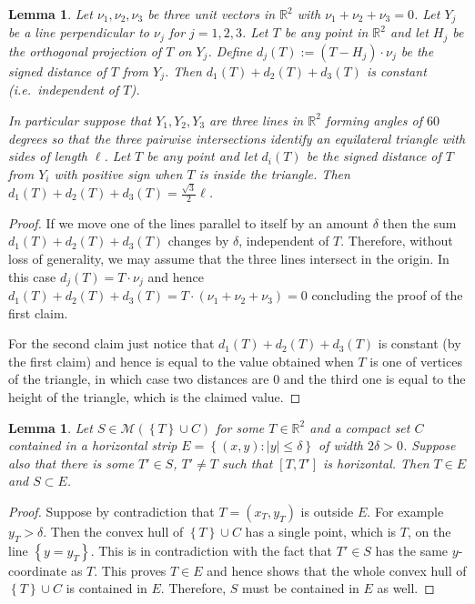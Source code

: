 \documentclass{amsart}
\newcommand{\RR}{\mathbb R}
\newcommand{\abs}[1]{\left\vert #1 \right\vert}
\newcommand{\ENCLOSE}[1]{\left\{#1\right\}}
\newcommand{\M}{\mathcal{M}}
\newtheorem{lemma}[theorem]{Lemma}
\theoremstyle{definition}
\theoremstyle{remark}
\begin{document}
  \begin{lemma}\label{lm:tripod}
    Let $\nu_1,\nu_2,\nu_3$ be three unit vectors in $\RR^2$
    with $\nu_1+\nu_2+\nu_3=0$. 
    Let $Y_j$ be a line perpendicular to $\nu_j$ for $j=1,2,3$.
    Let $T$ be any point in $\RR^2$ and let $H_j$ be the orthogonal 
    projection of $T$ on $Y_j$.
    Define $d_j(T) := (T-H_j)\cdot \nu_j$
    be the signed distance of $T$ from $Y_j$.
    Then $d_1(T) + d_2(T) + d_3(T)$ is constant 
    (i.e.\ independent of $T$).
  
    In particular suppose that  
    $Y_1,Y_2,Y_3$ are three lines in $\RR^2$
    forming angles of $60$ degrees so that 
    the three pairwise intersections identify
    an equilateral triangle with sides of length $\ell$.
    Let $T$ be any point and let $d_i(T)$ be 
    the signed distance of $T$ from $Y_i$
    with positive sign when $T$ is inside the triangle.
    Then $d_1(T) + d_2(T) + d_3(T) = \frac{\sqrt 3}{2}\ell$.
  \end{lemma}
  \begin{proof}
    If we move one of the lines parallel to itself by an amount $\delta$ 
    then the sum $d_1(T)+d_2(T)+d_3(T)$ changes by $\delta$, independent 
    of $T$.
    Therefore, without loss of generality, we may assume that the three lines 
    intersect in the origin.
    In this case $d_j(T) = T\cdot \nu_j$ and hence 
    $d_1(T)+d_2(T)+d_3(T) = T\cdot (\nu_1+\nu_2+\nu_3) = 0$
    concluding the proof of the first claim.
  
    For the second claim just notice that $d_1(T)+d_2(T)+d_3(T)$
    is constant (by the first claim) and hence is equal to the value 
    obtained when $T$ is one of vertices of the triangle, in which case 
    two distances are $0$ and the third one is equal to the height of the
    triangle, which is the claimed value.
  \end{proof}
  
  \begin{lemma}\label{lm:envelope}
  Let $S\in \M(\ENCLOSE{T}\cup C)$
  for some $T\in \RR^2$ and a compact set $C$ contained in a horizontal strip 
  $E=\ENCLOSE{(x,y)\colon \abs{y}\le \delta}$ of width $2\delta>0$.
  Suppose also that there is some $T'\in S$, $T'\neq T$ 
  such that $[T,T']$ is horizontal.
  Then $T\in E$ and $S\subset E$.
  \end{lemma}
  \begin{proof}
    Suppose by contradiction that $T=(x_T,y_T)$ is outside $E$.
    For example $y_T>\delta$. 
    Then the convex hull of $\ENCLOSE{T}\cup C$ has a single 
    point, which is $T$, on the line $\ENCLOSE{y=y_T}$. 
    This is in contradiction with the fact that $T'\in S$ 
    has the same $y$-coordinate as $T$.
    This proves $T\in E$ and hence
    shows that the whole convex hull of 
    $\ENCLOSE{T}\cup C$ is contained in $E$. 
    Therefore, $S$ must be contained in $E$ as well.
  \end{proof}
  
\end{document}
